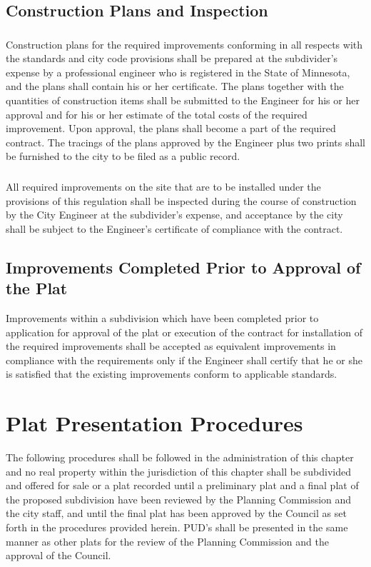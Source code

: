 \subsection{Construction Plans and Inspection}
\subsubsection{}
Construction plans for the required improvements conforming in all respects with the standards and city code provisions shall be prepared at the subdivider’s expense by a professional engineer who is registered in the State of Minnesota, and the plans shall contain his or her certificate. The plans together with the quantities of construction items shall be submitted to the Engineer for his or her approval and for his or her estimate of the total costs of the required improvement. Upon approval, the plans shall become a part of the required contract. The tracings of the plans approved by the Engineer plus two prints shall be furnished to the city to be filed as a public record.
\subsubsection{}
All required improvements on the site that are to be installed under the provisions of this regulation shall be inspected during the course of construction by the City Engineer at the subdivider’s expense, and acceptance by the city shall be subject to the Engineer’s certificate of compliance with the contract.
\subsection{Improvements Completed Prior to Approval of the Plat}
Improvements within a subdivision which have been completed prior to application for approval of the plat or execution of the contract for installation of the required improvements shall be accepted as equivalent improvements in compliance with the requirements only if the Engineer shall certify that he or she is satisfied that the existing improvements conform to applicable standards.


\setcounter{section}{64}
\section{Plat Presentation Procedures}
The following procedures shall be followed in the administration of this chapter and no real property within the jurisdiction of this chapter shall be subdivided and offered for sale or a plat recorded until a preliminary plat and a final plat of the proposed subdivision have been reviewed by the Planning Commission and the city staff, and until the final plat has been approved by the Council as set forth in the procedures provided herein. PUD’s shall be presented in the same manner as other plats for the review of the Planning Commission and the approval of the Council.

